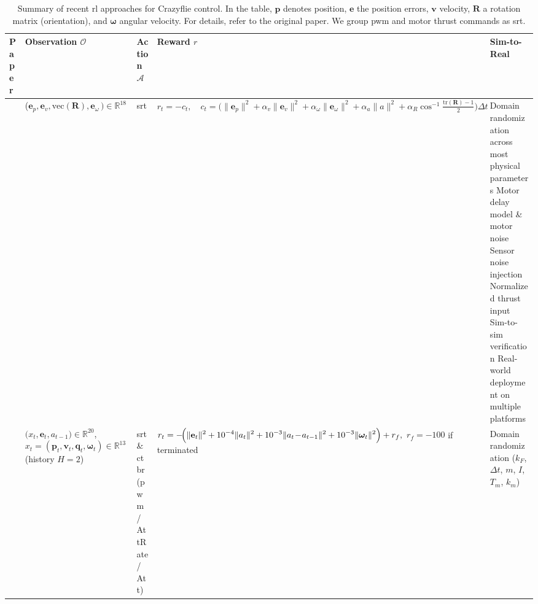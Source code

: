 \begin{table*}[!b]
  \centering
  \caption[Summary of \gls{rl} approaches]{Summary of recent \gls{rl} approaches for Crazyflie control. In the table, $\mathbf{p}$ denotes position, $\mathbf{e}$ the position errors, $\mathbf{v}$ velocity, $\mathbf{R}$ a rotation matrix (orientation), and $\boldsymbol{\omega}$ angular velocity. For details, refer to the original paper. We group \gls{pwm} and motor thrust commands as \gls{srt}.}
  \label{tab:rl_comparison}
  \scriptsize
  \begin{tabularx}{\textwidth}{p{0.7cm} p{3.0cm} p{1.3cm} p{3.5cm} X}
    \toprule
    \rowcolor{white}
    \textbf{Paper} & \textbf{Observation $\mathcal{O}$} & \textbf{Action $\mathcal{A}$} & \textbf{Reward $r$} & \textbf{Sim-to-Real} \\
    \midrule
    \cite{molchanov_sim--multi-real_2019} & 
    ($\mathbf e_p,\mathbf e_v,\mathrm{vec}(\mathbf{R}),\mathbf e_\omega\,)\in\mathbb R^{18} $ & 
    \gls{srt}  & 
      \(\displaystyle
    r_t=-c_t,\quad
    c_t=\bigl(\|\mathbf e_p\|^2+\alpha_v\|\mathbf e_v\|^2+\alpha_\omega\|\mathbf e_\omega\|^2+\alpha_a\|a\|^2+\alpha_R\cos^{-1}\!\tfrac{\mathrm{tr}(\mathbf{R})-1}{2}\bigr)\Delta t
    \) 
    &
     Domain randomization across most physical parameters\newline
      Motor delay model \& motor noise\newline
      Sensor noise injection\newline
      Normalized thrust input\newline
      Sim-to-sim verification\newline
      Real-world deployment on multiple platforms  \\
    \cite{gronauer_using_2022} & 
    $\bigl(x_t,\mathbf{e}_t,a_{t-1}\bigr)\!\in\!\mathbb{R}^{20}$, \newline 
    $x_t=(\mathbf{p}_t,\mathbf{v}_t,\mathbf{q}_t,\boldsymbol{\omega}_t)\!\in\!\mathbb{R}^{13}$ \newline 
    (history $H{=}2$) & 
    \gls{srt} \& \gls{ctbr}\newline 
    (\gls{pwm} / AttRate / Att) & 
    $\displaystyle r_t= -\!\Bigl(\|\mathbf{e}_t\|^{2} + 10^{-4}\|a_t\|^{2} + 10^{-3}\|a_t\!-\!a_{t-1}\|^{2} + 10^{-3}\|\boldsymbol{\omega}_t\|^{2}\Bigr) + r_f,$ \newline 
    $r_f = -100$ if terminated &
    Domain randomization ($k_F$, $\Delta t$, $m$, $I$, $T_m$, $k_m$) \newline

\end{tabularx}
\end{table*}
